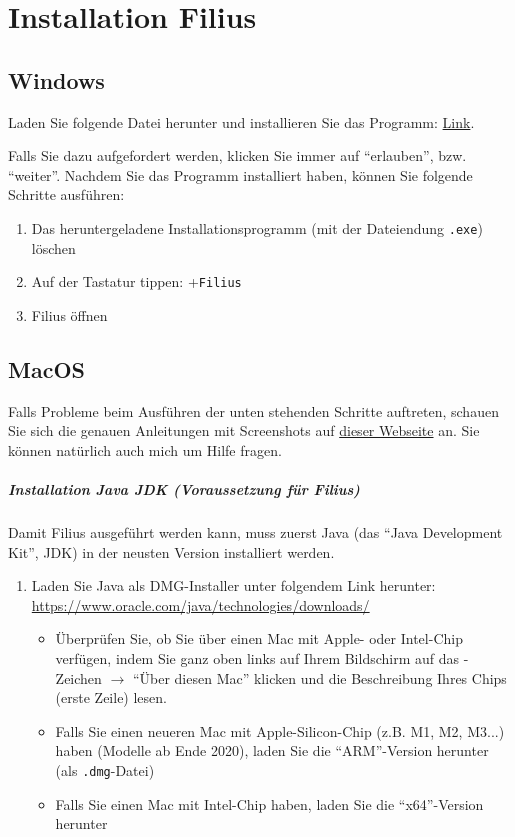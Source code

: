 \chapter{Installation Filius}
\label{subsec:filius-installation}
\section{Windows}
Laden Sie folgende Datei herunter und installieren Sie das Programm:  \href{https://www.lernsoftware-filius.de/Herunterladen}{Link}.

Falls Sie dazu aufgefordert werden, klicken Sie immer auf \enquote{erlauben}, bzw. \enquote{weiter}. Nachdem Sie das Programm installiert haben, können Sie folgende Schritte ausführen:
\begin{enumerate}
	\item Das heruntergeladene Installationsprogramm (mit der Dateiendung \texttt{.exe}) löschen
	\item Auf der Tastatur tippen: \faWindows+\texttt{Filius}
	\item Filius öffnen
\end{enumerate}
\section{MacOS}
\begin{mycaution}
	Falls Probleme beim Ausführen der unten stehenden Schritte auftreten, schauen Sie sich die genauen Anleitungen mit Screenshots auf \href{https://oinf.ch/wp-content/uploads/Anleitung_Filius_Mac-OS.pdf}{dieser Webseite} an. Sie können natürlich auch mich um Hilfe fragen.
\end{mycaution}
\paragraph*{Installation Java JDK (Voraussetzung für Filius)}
Damit Filius ausgeführt werden kann, muss zuerst Java (das \enquote{Java Development Kit}, JDK) in der neusten Version installiert werden.
\begin{enumerate}
	\item Laden Sie Java als DMG-Installer unter folgendem Link herunter: \url{https://www.oracle.com/java/technologies/downloads/}
	      \begin{itemize}
		      \item Überprüfen Sie, ob Sie über einen Mac mit Apple- oder Intel-Chip verfügen, indem Sie ganz oben links auf Ihrem Bildschirm auf das \faApple{}-Zeichen $\rightarrow$ \enquote{Über diesen Mac} klicken und die Beschreibung Ihres Chips (erste Zeile) lesen.
		      \item Falls Sie einen neueren Mac mit Apple-Silicon-Chip (z.B. M1, M2, M3...) haben (Modelle ab Ende 2020), laden Sie die \enquote{ARM}-Version herunter (als \texttt{.dmg}-Datei)
		      \item Falls Sie einen Mac mit Intel-Chip haben, laden Sie die \enquote{x64}-Version herunter
	      \end{itemize}
\end{enumerate}

